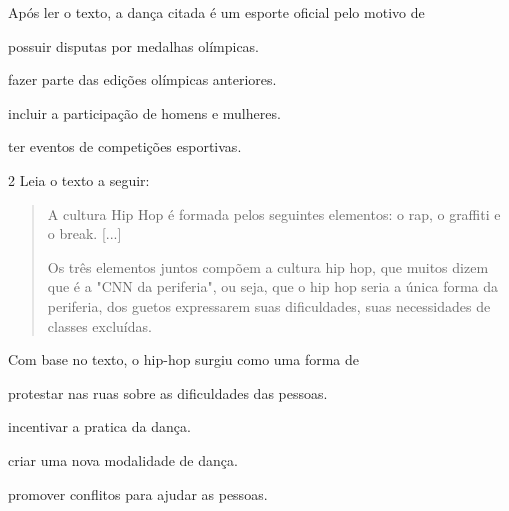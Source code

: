 Após ler o texto, a dança citada é um esporte oficial pelo motivo de

\begin{escolha}
\item possuir disputas por medalhas olímpicas.

\item fazer parte das edições olímpicas anteriores.

\item incluir a participação de homens e mulheres.

\item ter eventos de competições esportivas.
\end{escolha}


\num{2} Leia o texto a seguir:

\begin{quote}
A cultura Hip Hop é formada pelos seguintes elementos: o rap, o graffiti
e o break. {[}...{]}

Os três elementos juntos compõem a cultura hip hop, que muitos dizem que
é a "CNN da periferia", ou seja, que o hip hop seria a única forma da
periferia, dos guetos expressarem suas dificuldades, suas necessidades
de classes excluídas.

\end{quote}

Com base no texto, o hip-hop surgiu como uma forma de

\begin{escolha}
\item protestar nas ruas sobre as dificuldades das pessoas.

\item incentivar a pratica da dança.

\item criar uma nova modalidade de dança.

\item promover conflitos para ajudar as pessoas.
\end{escolha}

